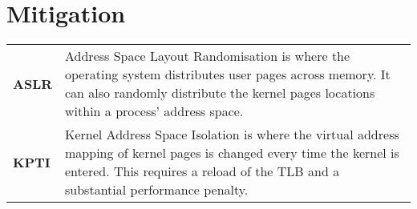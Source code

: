 \section{Mitigation}
\begin{center}
    \begin{tabular}{p{} p{}}
        \textbf{ASLR} & Address Space Layout Randomisation is where the operating system distributes user pages across memory. It can also randomly distribute the kernel pages locations within a process' address space. \\
        \textbf{KPTI} & Kernel Address Space Isolation is where the virtual address mapping of kernel pages is changed every time the kernel is entered. This requires a reload of the TLB and a substantial performance penalty. \\
    \end{tabular}
\end{center}

